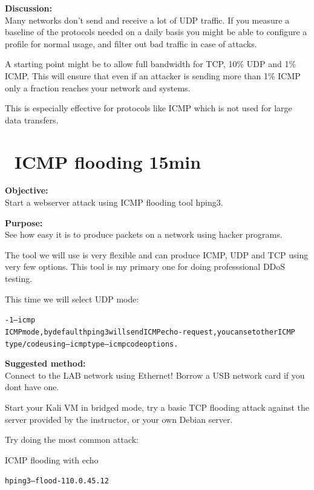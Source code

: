 \documentclass[a4paper,11pt,notitlepage]{report}
\begin{document}
{\bf Discussion:}\\
Many networks don't send and receive a lot of UDP traffic. If you measure a baseline of the protocols needed on a daily basis you might be able to configure a profile for normal usage, and filter out bad traffic in case of attacks.

A starting point might be to allow full bandwidth for TCP, 10\% UDP and 1\% ICMP. This will ensure that even if an attacker is sending more than 1\% ICMP only a fraction reaches your network and systems.

This is especially effective for protocols like ICMP which is not used for large data transfers.

\chapter{\faInfoCircle\ ICMP flooding 15min}

{\bf Objective:}\\
Start a webserver attack using ICMP flooding tool hping3.

{\bf Purpose:}\\
See how easy it is to produce packets on a network using hacker programs.

The tool we will use is very flexible and can produce ICMP, UDP and TCP using very few options. This tool is my primary one for doing professsional DDoS testing.

This time we will select UDP mode:

\begin{alltt}\footnotesize
-1 --icmp
       ICMP  mode,  by  default  hping3  will  send  ICMP echo-request, you can set other ICMP
       type/code using --icmptype --icmpcode options.
\end{alltt}

{\bf Suggested method:}\\
Connect to the LAB network using Ethernet! Borrow a USB network card if you dont have one.

Start your Kali VM in bridged mode, try a basic TCP flooding attack against the server provided by the instructor, or your own Debian server.

Try doing the most common attack:
\begin{list2}
\item ICMP flooding with echo
\end{list2}

\begin{alltt}\footnotesize
hping3 --flood -1 10.0.45.12
\end{alltt}
\end{document}
